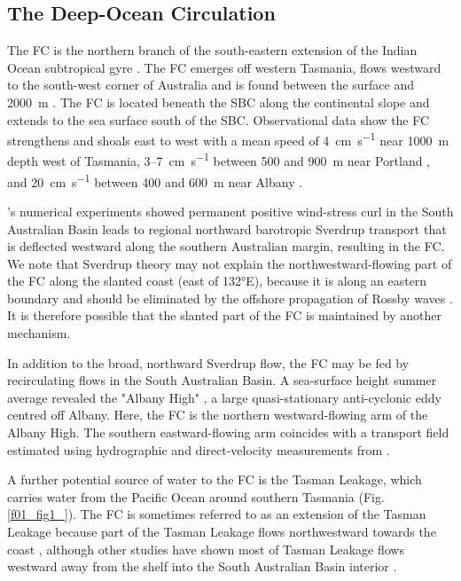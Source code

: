 \documentclass[preprint,3p,review,12pt]{elsarticle}
\newcommand{\citepos}[1]{\citeauthor{#1}'s \citeyearpar{#1}}
\begin{document}
\subsection{The Deep-Ocean Circulation} \label{The Deep-Ocean Circulation}
The FC is the northern branch of the south-eastern extension of the Indian Ocean subtropical gyre \citep{Hufford1997, McCartney2007}. The FC emerges off western Tasmania, flows westward to the south-west corner of Australia and is found between the surface and \SI{2000}{\meter} \citep{Middleton2002}. The FC is located beneath the SBC along the continental slope and extends to the sea surface south of the SBC\@.
Observational data show the FC strengthens and shoals east to west with a mean speed of \SI{4}{\centi\meter\per\second} near \SI{1000}{\meter} depth west of Tasmania, \num{3}--\SI{7}{\centi\meter\per\second} between \num{500} and \SI{900}{\meter} near Portland \citep{Middleton2007}, and \SI{20}{\centi\meter\per\second} between \num{400} and \SI{600}{\meter} near Albany \citep{Cresswell1993}.

\citepos{Middleton2002} numerical experiments showed permanent positive wind-stress curl in the South Australian Basin leads to regional northward barotropic Sverdrup transport that is deflected westward along the southern Australian margin, resulting in the FC. We note that Sverdrup theory may not explain the northwestward-flowing part of the FC along the slanted coast (east of \ang{132}E), because it is along an eastern boundary \citep{McCreary1981,McCreary1991} and should be eliminated by the offshore propagation of Rossby waves \citep{Anderson1975}. It is therefore possible that the slanted part of the FC is maintained by another mechanism.

In addition to the broad, northward Sverdrup flow, the FC may be fed by recirculating flows in the South Australian Basin. A sea-surface height summer average \citep{Middleton2003} revealed the "Albany High" \citep{Middleton2007}, a large quasi-stationary anti-cyclonic eddy centred off Albany. Here, the FC is the northern westward-flowing arm of the Albany High. The southern eastward-flowing arm coincides with a transport field estimated using hydrographic and direct-velocity measurements from \citet{McCartney2007}.

A further potential source of water to the FC is the Tasman Leakage, which carries water from the Pacific Ocean around southern Tasmania (Fig.\,\ref{f01_fig1_}). The FC is sometimes referred to as an extension of the Tasman Leakage because part of the Tasman Leakage flows northwestward towards the coast \citep{Feng2016,Middleton2002,Rosell-Fieschi2013}, although other studies have shown most of Tasman Leakage flows westward away from the shelf into the South Australian Basin interior \citep{Speich2002,vanSebille2012,vanSebille2014}.
\end{document}
